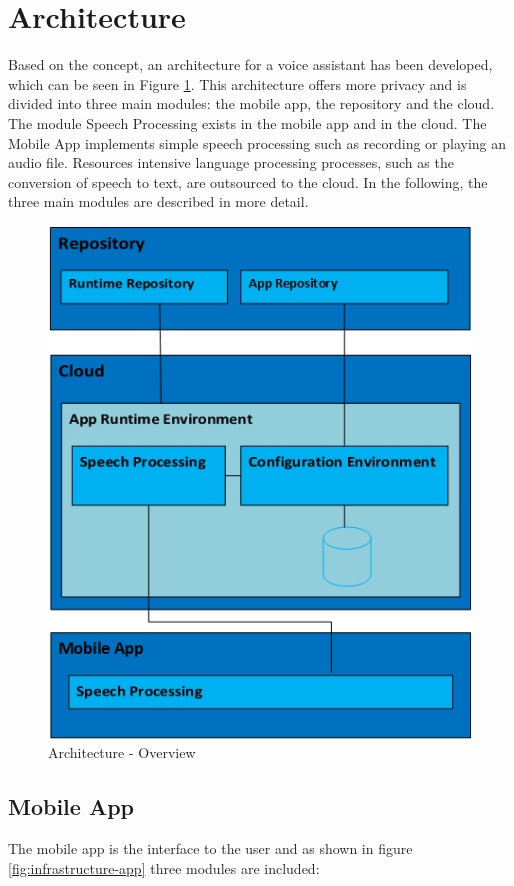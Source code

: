 \section{Architecture}\label{sec:architecure}
Based on the concept, an architecture for a voice assistant has been developed, which can be seen in Figure \ref{fig:infrastruktur-overview}. This architecture offers more privacy and is divided into three main modules: the mobile app, the repository and the cloud. The module \glqq Speech Processing\grqq{} exists in the mobile app and in the cloud. The Mobile App implements simple speech processing such as recording or playing an audio file. Resources intensive language processing processes, such as the conversion of speech to text, are outsourced to the cloud. In the following, the three main modules are described in more detail.

\begin{figure}[h!]
	\centering
	\includegraphics[width=0.8\linewidth]{Picture/Infrastruktur-Overview.jpg}
	\caption[Architecture - Overview]{Architecture - Overview}
	\label{fig:infrastruktur-overview}
\end{figure}

\subsection{Mobile App}
The mobile app is the interface to the user and as shown in figure \ref{fig:infrastructure-app} three modules are included:

